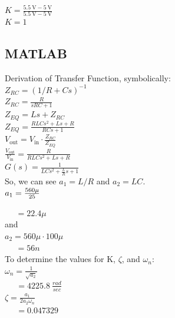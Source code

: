 \documentclass[a4paper,12pt]{article}
\begin{document}
$K = \frac{\SI{5.5}{\volt} - \SI{5}{\volt}}{\SI{5.5}{\volt} - \SI{5}{\volt}}$\\
 
$K = 1$

\subsection{MATLAB}

Derivation of Transfer Function, symbolically:\\

$Z_{RC} = (1/R+Cs)^{-1}$\\

$Z_{RC} = \frac{R}{sRC+1}$\\

$Z_{EQ} = Ls + Z_{RC}$\\

$Z_{EQ} = \frac{RLCs^2+Ls+R}{RCs+1}$\\

$V_{\textrm{out}} = V_{\textrm{in}} \cdot \frac{Z_{RC}}{Z_{EQ}}$\\

$\frac{V_{\textrm{out}}}{V_{\textrm{in}}} = \frac{R}{RLCs^2+Ls+R}$\\

$G(s) = \frac{1}{LCs^2+\frac{L}{R}s+1}$\\

So, we can see $a_1 = L/R$ and $a_2 = LC$.\\

$a_1 = \frac{560\mu}{25}\\$

$\;\;\;\;\: = 22.4\mu$\\

and\\

$a_2 = 560\mu \cdot100\mu$ \\

$\;\;\;\;\: = 56n$\\

To determine the values for K, $\zeta$, and $\omega_n$:\\

$\omega_n  = \frac{1}{\sqrt{a_2}}$\\

$\;\;\;\;\;= \SI{4225.8}{\frac{rad}{sec}}$\\

$\zeta = \frac{a_1}{2a_2\omega_n}$\\

$\;\;\;\;\;= \SI{0.047329}$\\
\end{document}
